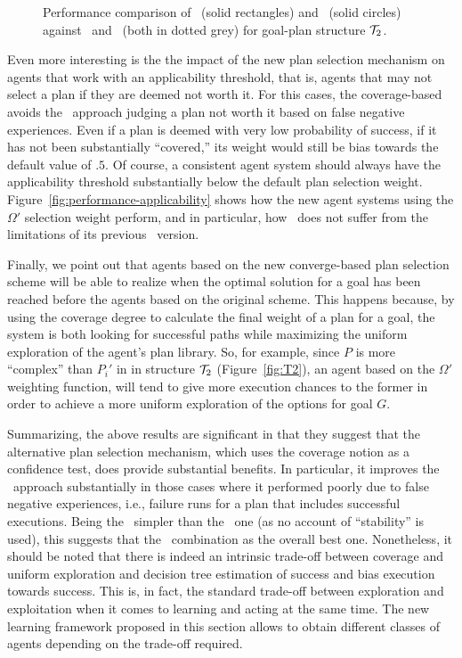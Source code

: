 \begin{figure}[t]
\begin{center}

\caption{Performance comparison of \CLSELB\ (solid rectangles) and \BULSELB\
(solid circles) against \CLSELA\ and \BULSELA\ (both in dotted grey) for
goal-plan structure ${\mathcal{T}}_2$.}
\label{fig:T2_result2}
\end{center}
\end{figure}



Even more interesting is the the impact of the new plan selection mechanism on
agents that work with an applicability threshold, that is, agents that may not
select a plan if they are deemed not worth it. For this cases, the coverage-based
avoids the \CL\ approach judging a plan not worth it based on false negative
experiences. Even if a plan is deemed with very low probability of success, if it
has not been substantially ``covered,'' its weight would still be bias towards the
default value of $.5$. Of course, a consistent agent system should always have
the applicability threshold substantially below the default plan selection
weight.
Figure~\ref{fig:performance-applicability} shows how the new agent systems
using the $\Omega'$ selection weight perform, and in particular, how \CLSELB\
does not suffer from the limitations of its previous \CLSELA\ version.


Finally, we point out that agents based on the new converge-based plan selection
scheme will be able to realize when the optimal solution for a goal has been
reached before the agents based on the original scheme.
This happens because, by using the coverage degree to calculate the final weight
of a plan for a goal, the system is both looking for successful paths while
maximizing    the uniform exploration of the agent's plan library.
So, for example, since $P$ is more ``complex'' than $P_i'$ in in structure ${\mathcal{T}}_2$
(Figure~\ref{fig:T2}), an agent based on the $\Omega'$ weighting function, will
tend to give more execution chances to the former in order to achieve a more
uniform exploration of the options for goal $G$.


 

Summarizing, the above results are significant in that they suggest that the
alternative plan selection mechanism, which uses the coverage notion as a
confidence test, does provide substantial benefits. In particular, it improves
the \CL\ approach substantially in those cases where it performed poorly due to
false negative experiences, i.e., failure runs for a plan that includes
successful executions.  Being the \CL\  simpler than the \BUL\ one (as no account
of ``stability'' is used), this suggests that the \CLSELB\ combination as the
overall best one.
Nonetheless, it should be noted that there is indeed an intrinsic trade-off
between coverage and uniform exploration and decision tree estimation of success
and bias execution towards success. This is, in fact, the standard trade-off
between exploration and exploitation when it comes to learning and acting at the
same time.
The new learning framework proposed in this section allows to obtain different
classes of agents depending on the trade-off required.




